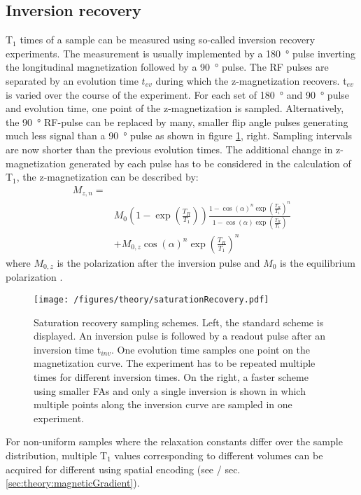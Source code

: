         \subsection{Inversion recovery}
        T$_1$ times of a sample can be measured using so-called inversion recovery experiments. The measurement is usually implemented by a \SI{180}{\degree} pulse inverting the longitudinal magnetization followed by a \SI{90}{\degree} pulse. The RF pulses are separated by an evolution time $t_{ev}$ during which the z-magnetization recovers. t$_{ev}$ is varied over the course of the experiment. For each set of \SI{180}{\degree} and \SI{90}{\degree} pulse and evolution time, one point of the z-magnetization is sampled. Alternatively, the \SI{90}{\degree} RF-pulse can be replaced by many, smaller flip angle pulses generating much less signal than a \SI{90}{\degree} pulse as shown in figure \ref{figure:theory:inversionRecovery}, right. Sampling intervals are now shorter than the previous evolution times. The additional change in z-magnetization generated by each pulse has to be considered in the calculation of T$_1$, the z-magnetization can be described by:
        \begin{equation}
            \begin{split}
                M_{z,n} =& \\ &M_0 \left(1-\exp{\left(\frac{T_R}{T_1}\right)}\right)\frac{1-\cos(\alpha)^n\exp\left(\frac{T_R}{T_1}\right)^n}{1-\cos(\alpha)\exp\left(\frac{T_R}{T_1}\right)}\\ 
                         &+M_{0,z}\cos(\alpha)^n\exp\left(\frac{T_R}{T_1}\right)^n
            \end{split}
        \end{equation}
        where $M_{0,z}$ is the polarization after the inversion pulse and $M_0$ is the equilibrium polarization \cite{look_time_1970-1, drobnitzky_closed-form_2017}.
            \begin{figure}
                \centering
                \texttt{[image: /figures/theory/saturationRecovery.pdf]}
                \caption[Saturation recovery]{Saturation recovery sampling schemes. Left, the standard scheme is displayed. An inversion pulse is followed by a readout pulse after an inversion time t$_{inv}$. One evolution time samples one point on the magnetization curve. The experiment has to be repeated multiple times for different inversion times. On the right, a faster scheme using smaller FAs and only a single inversion is shown in which multiple points along the inversion curve are sampled in one experiment.}
                \label{figure:theory:inversionRecovery}
            \end{figure}
            For non-uniform samples where the relaxation constants differ over the sample distribution, multiple T$_1$ values corresponding to different volumes can be acquired for different using spatial encoding (see \cite{scheffler_t1_2001} / sec. \ref{sec:theory:magneticGradient}).
